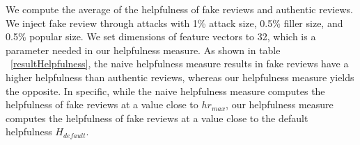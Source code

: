 \documentclass[master,english,final]{kaist-ucs}
\begin{document}


We compute the average of the helpfulness of fake reviews and authentic reviews.
We inject fake review through attacks with 1\% attack size, 0.5\% filler size, and 0.5\% popular size.
We set dimensions of feature vectors to 32, which is a parameter needed in our helpfulness measure.
As shown in table ~\ref{resultHelpfulness}, the naive helpfulness measure results in fake reviews have a higher helpfulness than authentic reviews, whereas our helpfulness measure yields the opposite.
In specific, while the naive helpfulness measure computes the helpfulness of fake reviews at a value close to $hr_{max}$, our helpfulness measure computes the helpfulness of fake reviews at a value close to the default helpfulness $H_{default}$.



\end{document}
